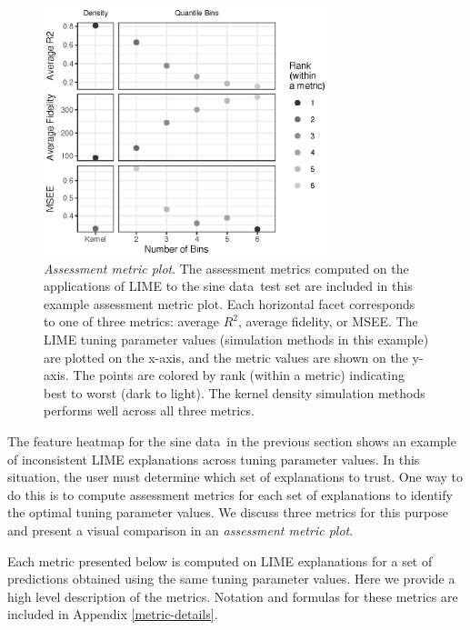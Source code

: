 \documentclass[AMS,STIX2COL]{WileyNJD-v2}\usepackage[]{graphicx}\usepackage[]{color}
\newenvironment{knitrout}{}{} %
\newcommand{\data}{sine data}
\begin{document}
\begin{figure}[!thp]
\begin{knitrout}
\color{fgcolor}

{\centering \includegraphics[width=3.25in]{figure-07-1} 

}



\end{knitrout}
\caption{\emph{Assessment metric plot}. The assessment metrics computed on the applications of LIME to the \data \ test set are included in this example assessment metric plot. Each horizontal facet corresponds to one of three metrics: average $R^2$, average fidelity, or MSEE. The LIME tuning parameter values (simulation methods in this example) are plotted on the x-axis, and the metric values are shown on the y-axis. The points are colored by rank (within a metric) indicating best to worst (dark to light). The kernel density simulation methods performs well across all three metrics.}
\label{fig:figure-07}
\end{figure}

The feature heatmap for the \data \ in the previous section shows an example of inconsistent LIME explanations across tuning parameter values. In this situation, the user must determine which set of explanations to trust. One way to do this is to compute assessment metrics for each set of explanations to identify the optimal tuning parameter values. We discuss three metrics for this purpose and present a visual comparison in an \emph{assessment metric plot}.

Each metric presented below is computed on  LIME explanations for a set of predictions obtained using the same tuning parameter values. Here we provide a high level description of the metrics. Notation and formulas for these metrics are included in Appendix \ref{metric-details}.
\end{document}
